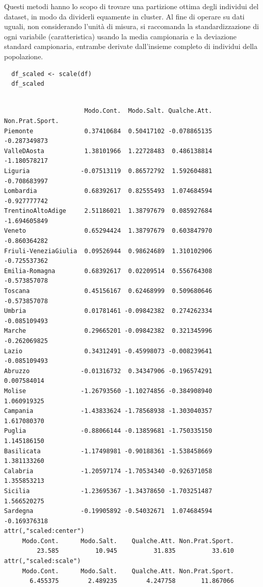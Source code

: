 Questi metodi hanno lo scopo di trovare una partizione ottima degli individui del dataset, in modo da dividerli equamente in cluster. Al fine di operare su dati uguali, non considerando l'unità di misura, si raccomanda la standardizzazione di ogni variabile (caratteristica) usando la media campionaria e la deviazione standard campionaria, entrambe derivate dall'insieme completo di individui della popolazione.

\vspace{5mm}
\begin{lstlisting}
  df_scaled <- scale(df)
  df_scaled
\end{lstlisting}
\vspace{5mm}


\vspace{5mm}
\begin{lstlisting}

                      Modo.Cont.  Modo.Salt. Qualche.Att. Non.Prat.Sport.
Piemonte              0.37410684  0.50417102 -0.078865135    -0.287349873
ValleDAosta           1.38101966  1.22728483  0.486138814    -1.180578217
Liguria              -0.07513119  0.86572792  1.592604881    -0.708683997
Lombardia             0.68392617  0.82555493  1.074684594    -0.927777742
TrentinoAltoAdige     2.51186021  1.38797679  0.085927684    -1.694605849
Veneto                0.65294424  1.38797679  0.603847970    -0.860364282
Friuli-VeneziaGiulia  0.09526944  0.98624689  1.310102906    -0.725537362
Emilia-Romagna        0.68392617  0.02209514  0.556764308    -0.573857078
Toscana               0.45156167  0.62468999  0.509680646    -0.573857078
Umbria                0.01781461 -0.09842382  0.274262334    -0.085109493
Marche                0.29665201 -0.09842382  0.321345996    -0.262069825
Lazio                 0.34312491 -0.45998073 -0.008239641    -0.085109493
Abruzzo              -0.01316732  0.34347906 -0.196574291     0.007584014
Molise               -1.26793560 -1.10274856 -0.384908940     1.060919325
Campania             -1.43833624 -1.78568938 -1.303040357     1.617080370
Puglia               -0.88066144 -0.13859681 -1.750335150     1.145186150
Basilicata           -1.17498981 -0.90188361 -1.538458669     1.381133260
Calabria             -1.20597174 -1.70534340 -0.926371058     1.355853213
Sicilia              -1.23695367 -1.34378650 -1.703251487     1.566520275
Sardegna             -0.19905892 -0.54032671  1.074684594    -0.169376318
attr(,"scaled:center")
     Modo.Cont.      Modo.Salt.    Qualche.Att. Non.Prat.Sport. 
         23.585          10.945          31.835          33.610 
attr(,"scaled:scale")
     Modo.Cont.      Modo.Salt.    Qualche.Att. Non.Prat.Sport. 
       6.455375        2.489235        4.247758       11.867066 

\end{lstlisting}
\vspace{5mm}

